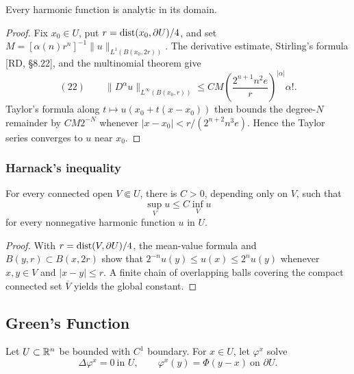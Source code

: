 \begin{theorem}[Analyticity]
\label{thm:harmonic-functions-analytic}

Every harmonic function is analytic in its domain.
\end{theorem}
\begin{proof}
\sketch Fix $x_0\in U$, put $r=\operatorname{dist}(x_0,\partial U)/4$, and set
$M=[\alpha(n)r^n]^{-1}\|u\|_{L^1(B(x_0,2r))}$. The derivative estimate,
Stirling's formula [RD, \S8.22], and the multinomial theorem give
$$(22)\qquad
\|D^\alpha u\|_{L^\infty(B(x_0,r))}
\le CM\left(\frac{2^{n+1}n^2e}{r}\right)^{|\alpha|}\alpha!.$$
Taylor's formula along $t\mapsto u(x_0+t(x-x_0))$ then bounds the degree-$N$
remainder by $CM2^{-N}$ whenever
$|x-x_0|<r/(2^{n+2}n^3e)$. Hence the Taylor series converges to $u$ near
$x_0$.
\end{proof}

\subsubsection{Harnack's inequality}
\label{sec:laplace-harnacks-inequality}

\begin{theorem}
\label{thm:harnacks-inequality}



For every connected open $V\Subset U$, there is $C>0$, depending only on
$V$, such that
$$\sup_Vu\le C\inf_Vu$$
for every nonnegative harmonic function $u$ in $U$.
\end{theorem}
\begin{proof}
\sketch With $r=\operatorname{dist}(V,\partial U)/4$, the mean-value formula and
$B(y,r)\subset B(x,2r)$ show that $2^{-n}u(y)\le u(x)\le2^n u(y)$ whenever
$x,y\in V$ and $|x-y|\le r$. A finite chain of overlapping balls covering the
compact connected set $\overline V$ yields the global constant.
\end{proof}

\subsection{Green's Function}
\label{sec:laplace-greens-function}

Let $U\subset\mathbb{R}^n$ be bounded with $C^1$ boundary. For $x\in U$, let
$\varphi^x$ solve
$$\Delta\varphi^x=0\ \text{in }U,
\qquad
\varphi^x(y)=\Phi(y-x)\ \text{on }\partial U.$$

